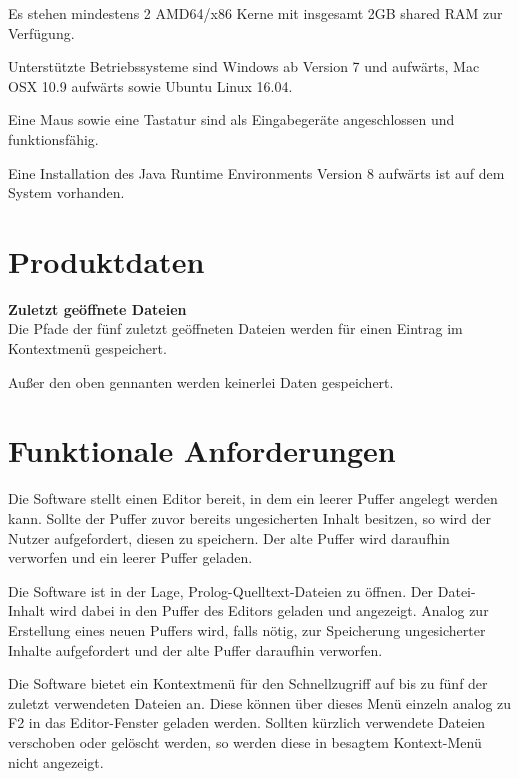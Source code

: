 \documentclass[parskip=full,11pt,twoside]{scrartcl}
\begin{document}
Es stehen mindestens 2 AMD64/x86 Kerne mit insgesamt 2GB shared RAM zur Verfügung.

Unterstützte Betriebssysteme sind Windows ab Version 7 und aufwärts, Mac OSX 10.9 aufwärts sowie Ubuntu Linux 16.04.

Eine Maus sowie eine Tastatur sind als Eingabegeräte angeschlossen und funktionsfähig.

Eine Installation des Java Runtime Environments Version 8 aufwärts ist auf dem System vorhanden.

\newpage

\section{Produktdaten}

\textbf{Zuletzt geöffnete Dateien} \\
Die Pfade der fünf zuletzt geöffneten Dateien werden für einen Eintrag im Kontextmenü gespeichert.

Außer den oben gennanten werden keinerlei Daten gespeichert.
\section{Funktionale Anforderungen}


Die Software stellt einen Editor bereit, in dem ein leerer Puffer angelegt werden kann. Sollte der Puffer zuvor bereits ungesicherten Inhalt besitzen, so wird der Nutzer aufgefordert, diesen zu speichern. Der alte Puffer wird daraufhin verworfen und ein leerer Puffer geladen.


Die Software ist in der Lage, Prolog-Quelltext-Dateien zu öffnen. Der Datei-Inhalt wird dabei in den Puffer des Editors geladen und angezeigt. Analog zur Erstellung eines neuen Puffers wird, falls nötig, zur Speicherung ungesicherter Inhalte aufgefordert und der alte Puffer daraufhin verworfen.


Die Software bietet ein Kontextmenü für den Schnellzugriff auf bis zu fünf der zuletzt verwendeten Dateien an. Diese können über dieses Menü einzeln analog zu F2 in das Editor-Fenster geladen werden. Sollten kürzlich verwendete Dateien verschoben oder gelöscht werden, so werden diese in besagtem Kontext-Menü nicht angezeigt.
\end{document}
